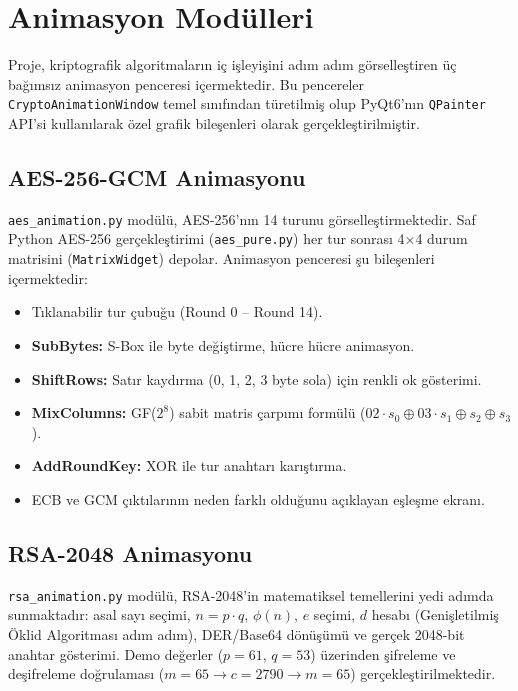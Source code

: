 \section{Animasyon Modülleri}

Proje, kriptografik algoritmaların iç işleyişini adım adım görselleştiren üç bağımsız animasyon penceresi içermektedir. Bu pencereler \texttt{CryptoAnimationWindow} temel sınıfından türetilmiş olup PyQt6'nın \texttt{QPainter} API'si kullanılarak özel grafik bileşenleri olarak gerçekleştirilmiştir.

\subsection{AES-256-GCM Animasyonu}

\texttt{aes\_animation.py} modülü, AES-256'nın 14 turunu görselleştirmektedir. Saf Python AES-256 gerçekleştirimi (\texttt{aes\_pure.py}) her tur sonrası 4×4 durum matrisini (\texttt{MatrixWidget}) depolar. Animasyon penceresi şu bileşenleri içermektedir:

\begin{itemize}
    \item Tıklanabilir tur çubuğu (Round 0 – Round 14).
    \item \textbf{SubBytes:} S-Box ile byte değiştirme, hücre hücre animasyon.
    \item \textbf{ShiftRows:} Satır kaydırma (0, 1, 2, 3 byte sola) için renkli ok gösterimi.
    \item \textbf{MixColumns:} GF($2^8$) sabit matris çarpımı formülü ($02 \cdot s_0 \oplus 03 \cdot s_1 \oplus s_2 \oplus s_3$).
    \item \textbf{AddRoundKey:} XOR ile tur anahtarı karıştırma.
    \item ECB ve GCM çıktılarının neden farklı olduğunu açıklayan eşleşme ekranı.
\end{itemize}

\subsection{RSA-2048 Animasyonu}

\texttt{rsa\_animation.py} modülü, RSA-2048'in matematiksel temellerini yedi adımda sunmaktadır: asal sayı seçimi, $n = p \cdot q$, $\phi(n)$, $e$ seçimi, $d$ hesabı (Genişletilmiş Öklid Algoritması adım adım), DER/Base64 dönüşümü ve gerçek 2048-bit anahtar gösterimi. Demo değerler ($p = 61$, $q = 53$) üzerinden şifreleme ve deşifreleme doğrulaması ($m = 65 \rightarrow c = 2790 \rightarrow m = 65$) gerçekleştirilmektedir.

